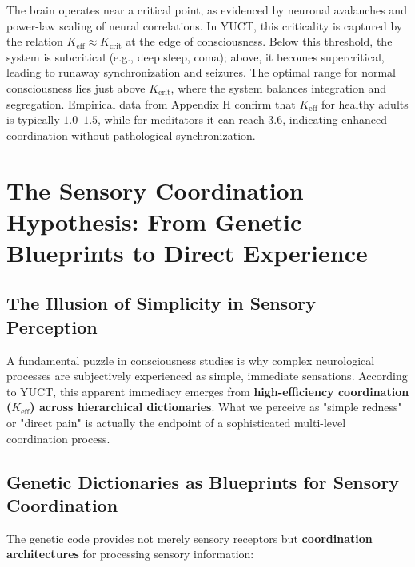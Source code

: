 \documentclass[12pt,a4paper]{article}
\newcommand{\eff}{\mathrm{eff}}
\newcommand{\Ke}{K_{\eff}}
\newcommand{\Kcrit}{K_{\mathrm{crit}}}
\begin{document}
	The brain operates near a critical point, as evidenced by neuronal avalanches and power-law scaling of neural correlations. In YUCT, this criticality is captured by the relation $\Ke \approx \Kcrit$ at the edge of consciousness. Below this threshold, the system is subcritical (e.g., deep sleep, coma); above, it becomes supercritical, leading to runaway synchronization and seizures. The optimal range for normal consciousness lies just above $\Kcrit$, where the system balances integration and segregation. Empirical data from Appendix H confirm that $\Ke$ for healthy adults is typically $1.0$–$1.5$, while for meditators it can reach $3.6$, indicating enhanced coordination without pathological synchronization.
	
	\section{The Sensory Coordination Hypothesis: From Genetic Blueprints to Direct Experience}
	
	\subsection{The Illusion of Simplicity in Sensory Perception}
	
	A fundamental puzzle in consciousness studies is why complex neurological processes are subjectively experienced as simple, immediate sensations. According to YUCT, this apparent immediacy emerges from \textbf{high-efficiency coordination ($\Ke$) across hierarchical dictionaries}. What we perceive as "simple redness" or "direct pain" is actually the endpoint of a sophisticated multi-level coordination process.
	
	\subsection{Genetic Dictionaries as Blueprints for Sensory Coordination}
	
	The genetic code provides not merely sensory receptors but \textbf{coordination architectures} for processing sensory information:
	
\end{document}
